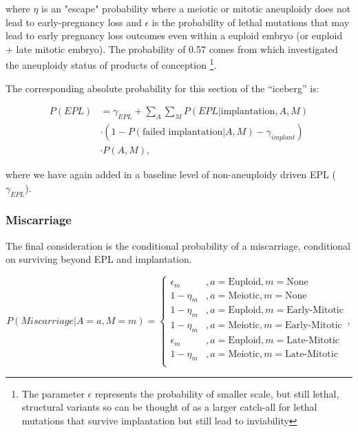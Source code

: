 \documentclass{article}
\begin{document}
where $\eta$ is an "escape" probability where a meiotic or mitotic aneuploidy does not lead to early-pregnancy loss and $\epsilon$ is the probability of lethal mutations that may lead to early pregnancy loss outcomes even within a euploid embryo (or euploid + late mitotic embryo). The probability of 0.57 comes from \citep{Gu2021-tk} which investigated the aneuploidy status of products of conception \footnote{The parameter $\epsilon$ represents the probability of smaller scale, but still lethal, structural variants so can be thought of as a larger catch-all for lethal mutations that survive implantation but still lead to inviability}. 

The corresponding absolute probability for this section of the ``iceberg'' is: 

\begin{equation}
\begin{aligned}
P(EPL) &=  \gamma_{EPL} + \sum_{A}\sum_{M} P(EPL | \text{implantation}, A, M) \\
&\cdot (1 - P(\text{failed implantation} | A, M) - \gamma_{implant})\\ 
&\cdot P(A, M),
\end{aligned}
\end{equation}

where we have again added in a baseline level of non-aneuploidy driven EPL ($\gamma_{EPL}$). 

\subsubsection*{Miscarriage}

The final consideration is the conditional probability of a miscarriage, conditional on surviving beyond EPL and implantation. 

\begin{equation}
	P(Miscarriage | A=a, M=m) = \begin{cases}
	\epsilon_m &, a= \text{Euploid}, m=\text{None}\\
	1 - \eta_m &, a = \text{Meiotic}, m=\text{None}\\
	1 - \eta_m &, a = \text{Euploid}, m=\text{Early-Mitotic}\\
	1 - \eta_m &, a = \text{Meiotic}, m=\text{Early-Mitotic}\\
	\epsilon_m &, a = \text{Euploid}, m=\text{Late-Mitotic}\\
	1 - \eta_m &, a = \text{Meiotic}, m=\text{Late-Mitotic}\\
	\end{cases},
\end{equation}
\end{document}
